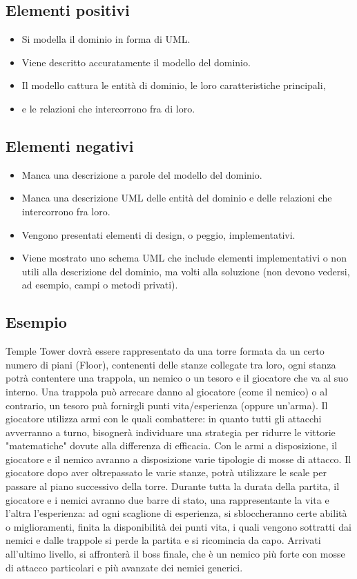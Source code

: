 \documentclass[a4paper,12pt]{report}
\begin{document}
\subsection*{Elementi positivi}
\begin{itemize}
	\item Si modella il dominio in forma di UML\@.
	\item Viene descritto accuratamente il modello del dominio.
	\item Il modello cattura le entità di dominio, le loro caratteristiche principali,
	\item e le relazioni che intercorrono fra di loro.
\end{itemize}

\subsection*{Elementi negativi}
\begin{itemize}
	\item Manca una descrizione a parole del modello del dominio.
	\item Manca una descrizione UML delle entità del dominio e delle relazioni che intercorrono fra loro.
	\item Vengono presentati elementi di design, o peggio, implementativi.
	\item Viene mostrato uno schema UML che include elementi implementativi o non utili alla descrizione del dominio,
	ma volti alla soluzione (non devono vedersi, ad esempio, campi o metodi privati).
\end{itemize}

\subsection*{Esempio}
Temple Tower dovrà essere rappresentato da una torre formata da un certo numero di piani (Floor), contenenti delle stanze collegate tra loro, ogni stanza potrà contentere una trappola, un nemico o un tesoro e il
%
giocatore che va al suo interno. Una trappola può arrecare danno al giocatore (come il nemico) o al contrario, un tesoro puà fornirgli punti vita/esperienza (oppure un'arma). Il giocatore utilizza
%
armi con le quali combattere: in quanto tutti gli attacchi avverranno a turno, bisognerà individuare una strategia per ridurre le
%
vittorie "matematiche" dovute alla differenza di efficacia.
%
Con le armi a disposizione, il giocatore e il nemico avranno a disposizione varie tipologie di mosse di attacco.
%
Il giocatore dopo aver oltrepassato le varie stanze, potrà utilizzare le scale per passare al piano successivo della torre.
%
Durante tutta la durata della partita, il giocatore e i nemici avranno due barre di stato, una rappresentante la vita e l'altra l'esperienza:
%
ad ogni scaglione di esperienza, si sbloccheranno certe abilità o miglioramenti, finita la disponibilità dei punti vita, i quali vengono sottratti dai nemici e dalle trappole
%
si perde la partita e si ricomincia da capo.
%
Arrivati all'ultimo livello, si affronterà il boss finale, che è un nemico più forte con mosse di attacco particolari e più
%
avanzate dei nemici generici.
\end{document}
